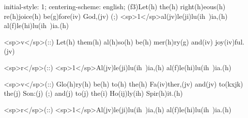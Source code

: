 initial-style: 1;
centering-scheme: english;
(f3)Let(h) the(h) right(h)eous(h) re(h)joice(h) be(g)fore(iv) God,(jv) (;) <sp>1</sp>al(jv)le(ji)lu(ih~)ia,(h) al(f)le(hi)lu(ih~)ia.(h)

<sp>v</sp>(::) Let(h) them(h) al(h)so(h) be(h) mer(h)ry(g) and(iv) joy(iv)ful.(jv)

<sp>r</sp>(::) <sp>1</sp>Al(jv)le(ji)lu(ih~)ia,(h) al(f)le(hi)lu(ih~)ia.(h)

<sp>v</sp>(::) Glo(h)ry(h) be(h) to(h) the(h) Fa(iv)ther,(jv) and(jv) to(kxjk) the(j) Son:(j) (;) and(j) to(j) the(i) Ho(ij)ly(ih) Spir(h)it.(h)

<sp>r</sp>(::) <sp>1</sp>Al(jv)le(ji)lu(ih~)ia,(h) al(f)le(hi)lu(ih~)ia.(h)